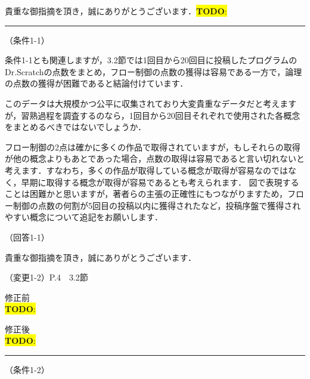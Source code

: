 \documentclass{jarticle} %
\newcommand{\todo}[1]{\colorbox{yellow}{{\bf TODO}:}{\color{red}{\textbf{[#1]}}}}
\def\subsection#1{ \vspace{1pc} {\gt #1} }
\def\nextans{ \vspace{2pc} \hrule }
\begin{document}
貴重な御指摘を頂き，誠にありがとうございます．\todo{HOGEHOGE}


      

\newpage
\nextans
\subsection{（条件1-1）}

条件1-1とも関連しますが，3.2節では1回目から20回目に投稿したプログラムのDr.Scratchの点数をまとめ，フロー制御の点数の獲得は容易である一方で，論理の点数の獲得が困難であると結論付けています．

このデータは大規模かつ公平に収集されており大変貴重なデータだと考えますが，習熟過程を調査するのなら，1回目から20回目それぞれで使用された各概念をまとめるべきではないでしょうか．

フロー制御の2点は確かに多くの作品で取得されていますが，もしそれらの取得が他の概念よりもあとであった場合，点数の取得は容易であると言い切れないと考えます．すなわち，多くの作品が取得している概念が取得が容易なのではなく，早期に取得する概念が取得が容易であるとも考えられます．
図で表現することは困難かと思いますが，著者らの主張の正確性にもつながりますため，フロー制御の点数の何割が5回目の投稿以内に獲得されたなど，投稿序盤で獲得されやすい概念について追記をお願いします．

\subsection{（回答1-1）}

貴重な御指摘を頂き，誠にありがとうございます．



\subsection{（変更1-2）P.4　3.2節 }
\vspace{-0.3cm}
\begin{description}
\item 修正前\\
\phantom{　}
\todo{hoge}
\vspace{-0.3cm}
\item 修正後\\
\phantom{　}
\todo{hoge}
\end{description}


\newpage
\nextans
\subsection{（条件1-2）}
\end{document}
